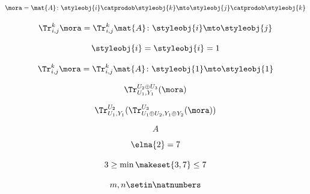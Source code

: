 {\begin{forslides}
        \begin{equation}
            \label{eq:feedback-006}
            \mora = \mat{A} \colon \styleobj{i} \catprodob \styleobj{k} \mto \styleobj{j} \catprodob \styleobj{k}
        \end{equation}

        \begin{equation}
            \label{eq:feedback-007}
            \Tr_{i,j}^{k} \mora = \Tr_{i,j}^{k} \mat{A} \colon \styleobj{i} \mto \styleobj{j}
        \end{equation}

        \begin{equation}
            \label{eq:feedback-008}
            \styleobj{i} = \styleobj{i} = 1
        \end{equation}

        \begin{equation}
            \label{eq:feedback-009}
            \Tr_{i,j}^{k} \mora = \Tr_{i,j}^{k} \mat{A} \colon \styleobj{1} \mto \styleobj{1}
        \end{equation}

        \begin{equation}
            \label{eq:feedback-010}
            \Tr_{U_1, Y_1}^{U_2 \oplus U_3}(\mora)
        \end{equation}

        \begin{equation}
            \label{eq:feedback-011}
            \Tr_{U_1, Y_1}^{U_2} ( \Tr_{U_1 \oplus U_2, Y_1 \oplus Y_2}^{U_3}(\mora))
        \end{equation}

        \begin{equation}
            \label{eq:feedback-012}
            A
        \end{equation}

        \begin{equation}
            \label{eq:feedback-013}
            \elna{2} = 7
        \end{equation}

        \begin{equation}
            \label{eq:feedback-014}
            3 \geq \min \makeset{3, 7} \leq 7
        \end{equation}

        \begin{equation}
            \label{eq:feedback-015}
            m, n \setin \natnumbers
        \end{equation}


\end{forslides}}
